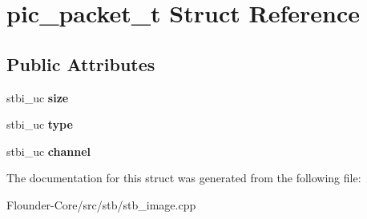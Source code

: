 \hypertarget{structpic__packet__t}{}\section{pic\+\_\+packet\+\_\+t Struct Reference}
\label{structpic__packet__t}
\subsection*{Public Attributes}
\begin{DoxyCompactItemize}
\item 
\mbox{\label{structpic__packet__t_ad33021e40c272a20d89bdcceabb20a71}} 
stbi\+\_\+uc {\bfseries size}
\item 
\mbox{\label{structpic__packet__t_abc346cfdcff43f051830335296f14aaa}} 
stbi\+\_\+uc {\bfseries type}
\item 
\mbox{\label{structpic__packet__t_af64f17c991495f3f3baf6782a253f7cc}} 
stbi\+\_\+uc {\bfseries channel}
\end{DoxyCompactItemize}


The documentation for this struct was generated from the following file\+:\begin{DoxyCompactItemize}
\item 
Flounder-\/\+Core/src/stb/stb\+\_\+image.\+cpp\end{DoxyCompactItemize}
